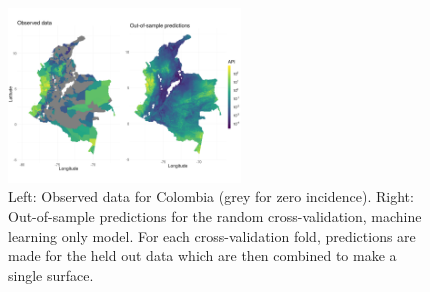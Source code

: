 \documentclass[11pt]{article}
\begin{document}
\begin{figure}
\centering
\includegraphics[trim={0 30mm 0 40mm}, width = 0.55\textwidth]{figs/col_obs_pred_map_ml.png} %
\caption{
  Left: Observed data for Colombia (grey for zero incidence). Right: Out-of-sample predictions for the random cross-validation, machine learning only model. For each cross-validation fold, predictions are made for the held out data which are then combined to make a single surface.
}
\label{f:map}
\end{figure}


\end{document}
